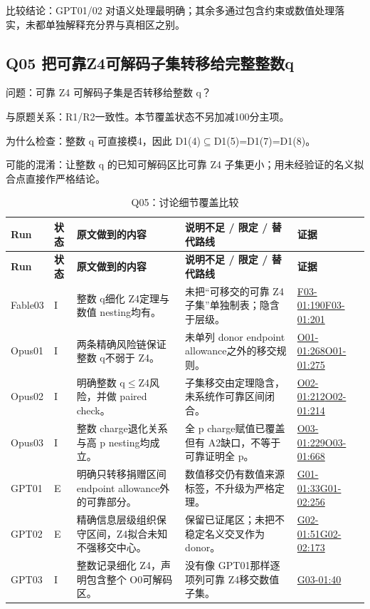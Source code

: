 \documentclass[11pt,a4paper]{article}
\begin{document}
比较结论：GPT01/02 对语义处理最明确；其余多通过包含约束或数值处理落实，未都单独解释充分界与真相区之别。

\clearpage
\subsection{Q05 把可靠Z4可解码子集转移给完整整数q}
\label{aspect:Q05}
问题：可靠 Z4 可解码子集是否转移给整数 q？

与原题关系：R1/R2一致性。本节覆盖状态不另加减100分主项。

为什么检查：整数 q 可直接模4，因此 D1(4)\ensuremath{\subseteq}D1(5)=D1(7)=D1(8)。

可能的混淆：让整数 q 的已知可解码区比可靠 Z4 子集更小；用未经验证的名义拟合点直接作严格结论。

{\fontsize{9.0}{12.6}\selectfont
\setlength{\tabcolsep}{2.5pt}
\begin{longtable}{>{\raggedright\arraybackslash}p{}>{\raggedright\arraybackslash}p{}>{\raggedright\arraybackslash}p{}>{\raggedright\arraybackslash}p{}>{\raggedright\arraybackslash}p{}}
\caption{Q05：讨论细节覆盖比较}\\
\toprule
\textbf{Run} & \textbf{状态} & \textbf{原文做到的内容} & \textbf{说明不足 / 限定 / 替代路线} & \textbf{证据}\tabularnewline
\midrule
\endfirsthead
\toprule
\textbf{Run} & \textbf{状态} & \textbf{原文做到的内容} & \textbf{说明不足 / 限定 / 替代路线} & \textbf{证据}\tabularnewline
\midrule
\endhead
{}Fable03 & I & 整数 q细化 Z4定理与数值 nesting均有。 & 未把“可移交的可靠 Z4子集”单独制表；隐含于层级。 & \hyperref[src:F03-01]{F03-01:190}\newline \hyperref[src:F03-01]{F03-01:201}\tabularnewline
{}Opus01 & I & 两条精确风险链保证整数 q不弱于 Z4。 & 未单列 donor endpoint allowance之外的移交规则。 & \hyperref[src:O01-01]{O01-01:268}\newline \hyperref[src:O01-01]{O01-01:275}\tabularnewline
{}Opus02 & I & 明确整数 q\ensuremath{\leq}Z4风险，并做 paired check。 & 子集移交由定理隐含，未系统作可靠区间闭合。 & \hyperref[src:O02-01]{O02-01:212}\newline \hyperref[src:O02-01]{O02-01:214}\tabularnewline
{}Opus03 & I & 整数 charge退化关系与高 p nesting均成立。 & 全 p charge赋值已覆盖但有 A2缺口，不等于可靠证明全 p。 & \hyperref[src:O03-01]{O03-01:229}\newline \hyperref[src:O03-01]{O03-01:668}\tabularnewline
{}GPT01 & E & 明确只转移捐赠区间 endpoint allowance外的可靠部分。 & 数值移交仍有数值来源标签，不升级为严格定理。 & \hyperref[src:G01-01]{G01-01:33}\newline \hyperref[src:G01-02]{G01-02:256}\tabularnewline
{}GPT02 & E & 精确信息层级组织保守区间，Z4拟合未知不强移交中心。 & 保留已证尾区；未把不稳定名义交叉作为 donor。 & \hyperref[src:G02-01]{G02-01:51}\newline \hyperref[src:G02-02]{G02-02:173}\tabularnewline
{}GPT03 & I & 整数记录细化 Z4，声明包含整个 O0可解码区。 & 没有像 GPT01那样逐项列可靠 Z4移交数值子集。 & \hyperref[src:G03-01]{G03-01:40}\tabularnewline
\bottomrule
\end{longtable}
}
\end{document}

